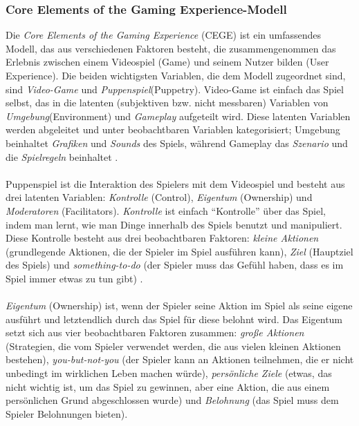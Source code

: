 \documentclass[a4paper,12pt]{scrartcl}
\begin{document}
\subsubsection{Core Elements of the Gaming Experience-Modell}
Die \textit{Core Elements of the Gaming Experience} (CEGE) ist ein umfassendes Modell, das aus verschiedenen Faktoren besteht, die zusammengenommen das Erlebnis zwischen einem Videospiel (Game) und seinem Nutzer bilden (User Experience).  Die beiden wichtigsten Variablen, die dem Modell zugeordnet sind, sind \textit{Video-Game} und \textit{Puppenspiel}(Puppetry). Video-Game ist einfach das Spiel selbst, das in die latenten (subjektiven bzw. nicht messbaren) Variablen von \textit{Umgebung}(Environment) und \textit{Gameplay} aufgeteilt wird. Diese latenten Variablen werden abgeleitet und unter beobachtbaren Variablen kategorisiert; Umgebung beinhaltet \textit{Grafiken} und \textit{Sounds} des Spiels, während Gameplay das \textit{Szenario} und die \textit{Spielregeln} beinhaltet \cite{CEGE2016}.
\\\\
Puppenspiel ist die Interaktion des Spielers mit dem Videospiel und besteht aus drei latenten Variablen: \textit{Kontrolle} (Control), \textit{Eigentum} (Ownership) und \textit{Moderatoren} (Facilitators). \textit{Kontrolle} ist einfach \enquote{Kontrolle} über das Spiel, indem man lernt, wie man Dinge innerhalb des Spiels benutzt und manipuliert. Diese Kontrolle besteht aus drei beobachtbaren Faktoren: \textit{kleine Aktionen} (grundlegende Aktionen, die der Spieler im Spiel ausführen kann), \textit{Ziel} (Hauptziel des Spiels) und \textit{something-to-do} (der Spieler muss das Gefühl haben, dass es im Spiel immer etwas zu tun gibt) \cite{CEGE2016}. 
\\\\
\textit{Eigentum} (Ownership) ist, wenn der Spieler seine Aktion im Spiel als seine eigene ausführt und letztendlich durch das Spiel für diese belohnt wird. Das Eigentum setzt sich aus vier beobachtbaren Faktoren zusammen: \textit{große Aktionen} (Strategien, die vom Spieler verwendet werden, die aus vielen kleinen Aktionen bestehen), \textit{you-but-not-you} (der Spieler kann an Aktionen teilnehmen, die er nicht unbedingt im wirklichen Leben machen würde), \textit{persönliche Ziele} (etwas, das nicht wichtig ist, um das Spiel zu gewinnen, aber eine Aktion, die aus einem persönlichen Grund abgeschlossen wurde) und \textit{Belohnung} (das Spiel muss dem Spieler Belohnungen bieten)\cite{CEGE2016}. 
\\\\
\end{document}
